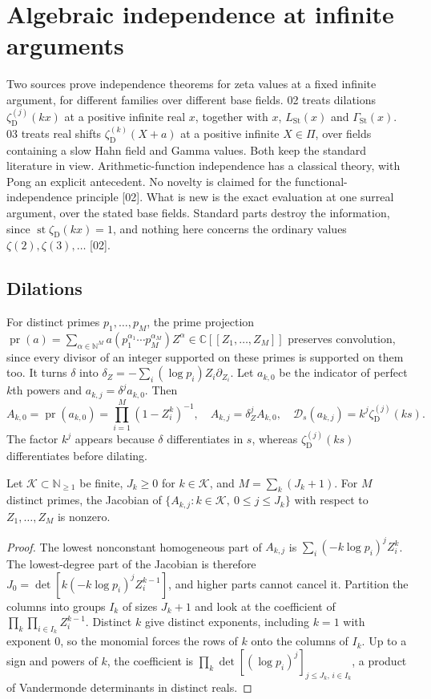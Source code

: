 \documentclass[11pt,a4paper]{article}
\numberwithin{equation}{section}
\theoremstyle{definition}
\theoremstyle{remark}
\newcommand{\C}{\mathbb C}
\newcommand{\N}{\mathbb N}
\newcommand{\st}{\operatorname{st}}
\newcommand{\LSt}{L_{\mathrm{St}}}
\newcommand{\GSt}{\Gamma_{\mathrm{St}}}
\newcommand{\zD}{\zeta_{\mathrm D}}
\newcommand{\DD}{\mathcal D}
\newcommand{\src}[1]{\textup{[#1]}}
\begin{document}
\section{Algebraic independence at infinite arguments}\label{gz:sec:independence}

Two sources prove independence theorems for zeta values at a fixed
infinite argument, for different families over different base fields. 02
treats dilations $\zD^{(j)}(kx)$ at a positive infinite real $x$, together
with $x$, $\LSt(x)$ and $\GSt(x)$. 03 treats real shifts
$\zD^{(k)}(X+a)$ at a positive infinite $X\in\Pi$, over fields containing a
slow Hahn field and Gamma values. Both keep the standard literature in
view. Arithmetic-function independence has a classical theory, with Pong
\cite{Pong} an explicit antecedent. No novelty is claimed for the
functional-independence principle \src{02}. What is new is the exact
evaluation at one surreal argument, over the stated base fields. Standard
parts destroy the information, since $\st\zD(kx)=1$, and nothing here
concerns the ordinary values $\zeta(2),\zeta(3),\dots$ \src{02}.

\subsection{Dilations}\label{gz:sec:dilation}
For distinct primes $p_1,\dots,p_M$, the prime projection
$\operatorname{pr}(a)=\sum_{\alpha\in\N^M}a(p_1^{\alpha_1}\cdots p_M^{\alpha_M})Z^\alpha\in\C[[Z_1,\dots,Z_M]]$
preserves convolution, since every divisor of an integer supported on these
primes is supported on them too. It turns $\delta$ into
$\delta_Z=-\sum_i(\log p_i)Z_i\partial_{Z_i}$. Let $a_{k,0}$ be the
indicator of perfect $k$th powers and $a_{k,j}=\delta^ja_{k,0}$. Then
\[
A_{k,0}=\operatorname{pr}(a_{k,0})=\prod_{i=1}^M(1-Z_i^k)^{-1},\quad A_{k,j}=\delta_Z^jA_{k,0},\quad
\DD_s(a_{k,j})=k^j\zD^{(j)}(ks).
\]
The factor $k^j$ appears because $\delta$ differentiates in $s$, whereas
$\zD^{(j)}(ks)$ differentiates before dilating.

\begin{lemma}[A nonzero Jacobian \src{02}]\label{gz:lem:jacobian}
Let $\mathcal K\subset\N_{\ge1}$ be finite, $J_k\ge0$ for $k\in\mathcal K$, and
$M=\sum_k(J_k+1)$. For $M$ distinct primes, the Jacobian of
$\{A_{k,j}:k\in\mathcal K,\ 0\le j\le J_k\}$ with respect to $Z_1,\dots,Z_M$ is
nonzero.
\end{lemma}
\begin{proof}
The lowest nonconstant homogeneous part of $A_{k,j}$ is
$\sum_i(-k\log p_i)^jZ_i^k$. The lowest-degree part of the Jacobian
is therefore $J_0=\det[k(-k\log p_i)^jZ_i^{k-1}]$, and higher parts
cannot cancel it. Partition the columns into groups $I_k$ of sizes $J_k+1$
and look at the coefficient of $\prod_k\prod_{i\in I_k}Z_i^{k-1}$.
Distinct $k$ give distinct exponents, including $k=1$ with exponent $0$, so
the monomial forces the rows of $k$ onto the columns of $I_k$. Up to a sign
and powers of $k$, the coefficient is $\prod_k\det[(\log p_i)^j]_{j\le J_k,\,i\in I_k}$,
a product of Vandermonde determinants in distinct reals.
\end{proof}
\end{document}
